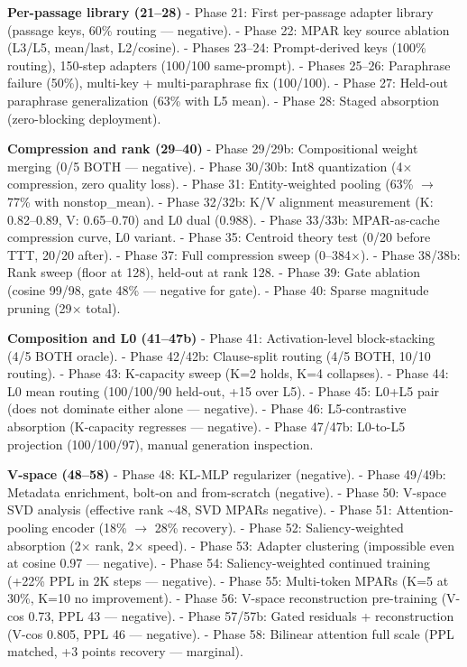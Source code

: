 \textbf{Per-passage library (21--28)} - Phase 21: First per-passage adapter library (passage keys, 60\% routing --- negative). - Phase 22: MPAR key source ablation (L3/L5, mean/last, L2/cosine). - Phases 23--24: Prompt-derived keys (100\% routing), 150-step adapters (100/100 same-prompt). - Phases 25--26: Paraphrase failure (50\%), multi-key + multi-paraphrase fix (100/100). - Phase 27: Held-out paraphrase generalization (63\% with L5 mean). - Phase 28: Staged absorption (zero-blocking deployment).

\textbf{Compression and rank (29--40)} - Phase 29/29b: Compositional weight merging (0/5 BOTH --- negative). - Phase 30/30b: Int8 quantization (4$\times$ compression, zero quality loss). - Phase 31: Entity-weighted pooling (63\% $\rightarrow$ 77\% with nonstop\_mean). - Phase 32/32b: K/V alignment measurement (K: 0.82--0.89, V: 0.65--0.70) and L0 dual (0.988). - Phase 33/33b: MPAR-as-cache compression curve, L0 variant. - Phase 35: Centroid theory test (0/20 before TTT, 20/20 after). - Phase 37: Full compression sweep (0--384$\times$). - Phase 38/38b: Rank sweep (floor at 128), held-out at rank 128. - Phase 39: Gate ablation (cosine 99/98, gate 48\% --- negative for gate). - Phase 40: Sparse magnitude pruning (29$\times$ total).

\textbf{Composition and L0 (41--47b)} - Phase 41: Activation-level block-stacking (4/5 BOTH oracle). - Phase 42/42b: Clause-split routing (4/5 BOTH, 10/10 routing). - Phase 43: K-capacity sweep (K=2 holds, K=4 collapses). - Phase 44: L0 mean routing (100/100/90 held-out, +15 over L5). - Phase 45: L0+L5 pair (does not dominate either alone --- negative). - Phase 46: L5-contrastive absorption (K-capacity regresses --- negative). - Phase 47/47b: L0-to-L5 projection (100/100/97), manual generation inspection.

\textbf{V-space (48--58)} - Phase 48: KL-MLP regularizer (negative). - Phase 49/49b: Metadata enrichment, bolt-on and from-scratch (negative). - Phase 50: V-space SVD analysis (effective rank \textasciitilde48, SVD MPARs negative). - Phase 51: Attention-pooling encoder (18\% $\rightarrow$ 28\% recovery). - Phase 52: Saliency-weighted absorption (2$\times$ rank, 2$\times$ speed). - Phase 53: Adapter clustering (impossible even at cosine 0.97 --- negative). - Phase 54: Saliency-weighted continued training (+22\% PPL in 2K steps --- negative). - Phase 55: Multi-token MPARs (K=5 at 30\%, K=10 no improvement). - Phase 56: V-space reconstruction pre-training (V-cos 0.73, PPL 43 --- negative). - Phase 57/57b: Gated residuals + reconstruction (V-cos 0.805, PPL 46 --- negative). - Phase 58: Bilinear attention full scale (PPL matched, +3 points recovery --- marginal).

